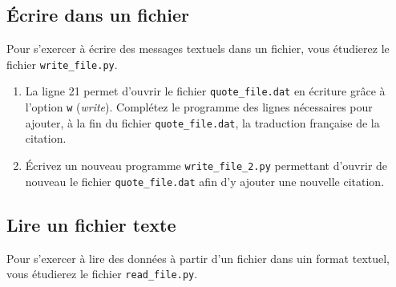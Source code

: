 
\subsection{Écrire dans un fichier}

Pour s'exercer à écrire des messages textuels dans un fichier, vous étudierez le fichier \texttt{write\_file.py}.

\begin{enumerate}

\item La ligne 21 permet d'ouvrir le fichier \texttt{quote\_file.dat} en écriture grâce
  à l'option \texttt{w} (\emph{write}).
  Complétez le programme des lignes nécessaires pour ajouter, à la fin du
  fichier \texttt{quote\_file.dat}, la traduction française de la citation.

\item   Écrivez   un  nouveau   programme   \texttt{write\_file\_2.py}
  permettant d'ouvrir  de nouveau le  fichier \texttt{quote\_file.dat}
  afin d'y ajouter une nouvelle citation.

\end{enumerate}



\subsection{Lire un fichier texte}

Pour  s'exercer à  lire des données à partir d'un  fichier dans uin format textuel,
vous  étudierez le  fichier \texttt{read\_file.py}.

